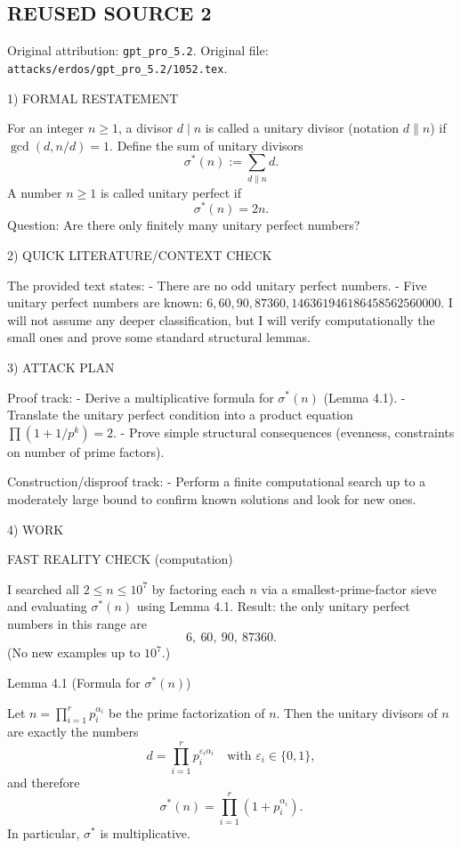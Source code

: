 \subsection*{REUSED SOURCE 2}
Original attribution: \texttt{gpt\_pro\_5.2}.
Original file: \texttt{attacks/erdos/gpt\_pro\_5.2/1052.tex}.


1) FORMAL RESTATEMENT

For an integer $n\ge 1$, a divisor $d\mid n$ is called a unitary divisor (notation $d\parallel n$)
if $\gcd(d,n/d)=1$.
Define the sum of unitary divisors
\[
  \sigma^*(n):=\sum_{d\parallel n} d.
\]
A number $n\ge 1$ is called unitary perfect if
\[
  \sigma^*(n)=2n.
\]
Question: Are there only finitely many unitary perfect numbers?

2) QUICK LITERATURE/CONTEXT CHECK

The provided text states:
- There are no odd unitary perfect numbers.
- Five unitary perfect numbers are known: $6,60,90,87360,146361946186458562560000$.
I will not assume any deeper classification, but I will verify computationally the small ones and prove
some standard structural lemmas.

3) ATTACK PLAN

Proof track:
- Derive a multiplicative formula for $\sigma^*(n)$ (Lemma 4.1).
- Translate the unitary perfect condition into a product equation $\prod (1+1/p^k)=2$.
- Prove simple structural consequences (evenness, constraints on number of prime factors).

Construction/disproof track:
- Perform a finite computational search up to a moderately large bound to confirm known solutions
  and look for new ones.

4) WORK

FAST REALITY CHECK (computation)

I searched all $2\le n\le 10^7$ by factoring each $n$ via a smallest-prime-factor sieve and evaluating
$\sigma^*(n)$ using Lemma 4.1.
Result: the only unitary perfect numbers in this range are
\[
  6,\ 60,\ 90,\ 87360.
\]
(No new examples up to $10^7$.)

Lemma 4.1 (Formula for $\sigma^*(n)$)

Let $n=\prod_{i=1}^r p_i^{\alpha_i}$ be the prime factorization of $n$.
Then the unitary divisors of $n$ are exactly the numbers
\[
  d=\prod_{i=1}^r p_i^{\varepsilon_i\alpha_i}\quad\text{with }\varepsilon_i\in\{0,1\},
\]
and therefore
\[
  \sigma^*(n)=\prod_{i=1}^r (1+p_i^{\alpha_i}).
\]
In particular, $\sigma^*$ is multiplicative.

